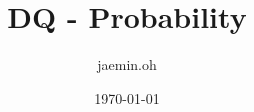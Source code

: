 \documentclass{amsart}
\date{\today}
\begin{document}
\author{jaemin.oh}
\title{DQ - Probability}

\maketitle


\end{document}
